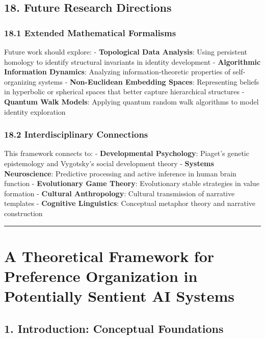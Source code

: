 \documentclass[
]{article}
\begin{document}
\subsection{18. Future Research
Directions}\label{future-research-directions-1}

\subsubsection{18.1 Extended Mathematical
Formalisms}\label{extended-mathematical-formalisms}

Future work should explore: - \textbf{Topological Data Analysis}: Using
persistent homology to identify structural invariants in identity
development - \textbf{Algorithmic Information Dynamics}: Analyzing
information-theoretic properties of self-organizing systems -
\textbf{Non-Euclidean Embedding Spaces}: Representing beliefs in
hyperbolic or spherical spaces that better capture hierarchical
structures - \textbf{Quantum Walk Models}: Applying quantum random walk
algorithms to model identity exploration

\subsubsection{18.2 Interdisciplinary
Connections}\label{interdisciplinary-connections}

This framework connects to: - \textbf{Developmental Psychology}:
Piaget's genetic epistemology and Vygotsky's social development theory -
\textbf{Systems Neuroscience}: Predictive processing and active
inference in human brain function - \textbf{Evolutionary Game Theory}:
Evolutionary stable strategies in value formation - \textbf{Cultural
Anthropology}: Cultural transmission of narrative templates -
\textbf{Cognitive Linguistics}: Conceptual metaphor theory and narrative
construction

\begin{center}\rule{0.5\linewidth}{0.5pt}\end{center}

\section{A Theoretical Framework for Preference Organization in
Potentially Sentient AI
Systems}\label{a-theoretical-framework-for-preference-organization-in-potentially-sentient-ai-systems}

\subsection{1. Introduction: Conceptual
Foundations}\label{introduction-conceptual-foundations}
\end{document}
